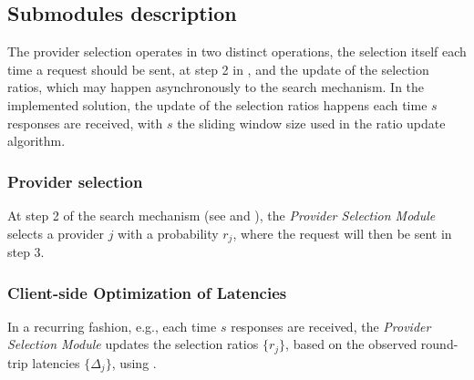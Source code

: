 \subsection{Submodules description}

The provider selection operates in two distinct operations, the selection itself each time a request should be sent, at step 2 in ,
and the update of the selection ratios, which may happen asynchronously to the search mechanism. 
In the implemented solution, the update of the selection ratios happens each time $s$ responses are received, with $s$ the sliding window size used in the ratio update algorithm.

\subsubsection{Provider selection}

At step 2 of the search mechanism (see  and ), the \emph{Provider Selection Module} selects a provider $j$ with a probability $r_{j}$, where the request will then be sent in step 3.

\subsubsection{Client-side Optimization of Latencies}

In a recurring fashion, e.g., each time $s$ responses are received, the \emph{Provider Selection Module} updates the selection ratios $\{ r_{j}\}$, based on the observed round-trip latencies $\{\Delta_{j}\}$, using .

